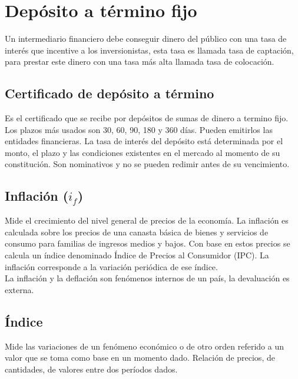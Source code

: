 \section{Depósito a término fijo}

Un intermediario financiero debe conseguir dinero del público con una tasa de interés que incentive a los inversionistas, esta tasa es llamada tasa de captación, para prestar este dinero con una tasa más alta llamada tasa de colocación.

\subsection{Certificado de depósito a término}
Es el certificado que se recibe por depósitos de sumas de dinero a termino fijo. Los plazos más usados son 30, 60, 90, 180 y 360 días. Pueden emitirlos las entidades financieras. La tasa de interés del depósito está determinada por el monto, el plazo y las condiciones existentes en el mercado al momento de su constitución. Son nominativos y no se pueden redimir antes de su vencimiento.\\






\subsection{Inflación ($i_f$)}
Mide el crecimiento del nivel general de precios de la economía. La inflación es calculada sobre los precios de una canasta básica de bienes y servicios de consumo para familias de ingresos medios y bajos. Con base en estos precios se calcula un índice denominado Índice de Precios al Consumidor (IPC). La inflación corresponde a la variación periódica de ese índice.\\
La inflación y la deflación son fenómenos internos de un país, la devaluación es externa.

\subsection{Índice}
Mide las variaciones de un fenómeno económico o de otro orden referido a un valor que se toma como base en un momento dado. Relación de precios, de cantidades, de valores entre dos períodos dados.

